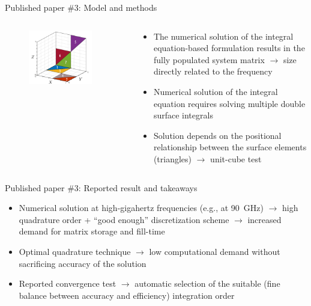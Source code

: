 \documentclass[xcolor=dvipsnames,10pt]{beamer}
\begin{document}
\begin{frame}{Published paper \#3: Model and methods}
\begin{columns}[c]
\begin{column}{0.4\textwidth}
\begin{onlyenv}
\begin{figure}
                \includegraphics[width=0.85\textwidth]{artwork/JCOMSS-cube.pdf}
            \end{figure}
            \end{onlyenv}
        \end{column} 
        \begin{column}{0.6\textwidth}
            \begin{itemize}
                \item<1> The numerical solution of the integral equation-based formulation results in the fully populated system matrix $\rightarrow$ size directly related to the frequency
                \item<2> Numerical solution of the integral equation requires solving multiple double surface integrals
                \item<3> Solution depends on the positional relationship between the surface elements (triangles) $\rightarrow$ unit-cube test
            \end{itemize}
        \end{column}
    \end{columns}  
\end{frame}

\begin{frame}{Published paper \#3: Reported result and takeaways}
    \begin{itemize}
        \item Numerical solution at high-gigahertz frequencies (e.g., at \SI{90}{\GHz}) $\rightarrow$ high quadrature order + ``good enough'' discretization scheme $\rightarrow$ increased demand for matrix storage and fill-time
        \item Optimal quadrature technique $\rightarrow$ low computational demand without sacrificing accuracy of the solution
        \item Reported convergence test $\rightarrow$ automatic selection of the suitable (fine balance between accuracy and efficiency) integration order
    \end{itemize}
\end{frame}
\end{document}
